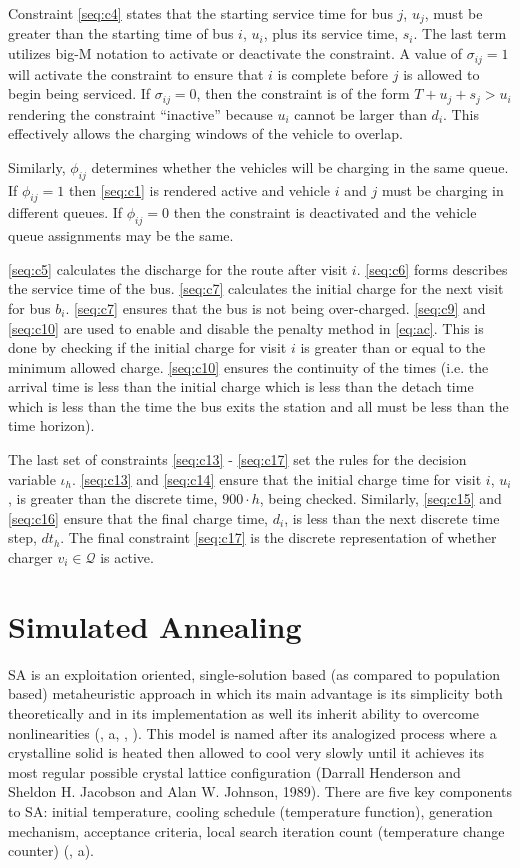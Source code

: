 \documentclass[11pt,a4paper,final]{article}
\newcommand{\Qset}{\mathcal{Q}}             %
\begin{document}
Constraint \ref{seq:c4} states that the starting service time for bus \(j\), \(u_j\), must be greater than the starting time
of bus \(i\), \(u_i\), plus its service time, \(s_i\). The last term utilizes big-M notation to activate or deactivate the
constraint. A value of \(\sigma_{ij} = 1\) will activate the constraint to ensure that \(i\) is complete before \(j\) is
allowed to begin being serviced. If \(\sigma_{ij} = 0\), then the constraint is of the form \(T + u_j + s_j > u_i\)
rendering the constraint ``inactive'' because \(u_i\) cannot be larger than \(d_i\). This effectively allows the charging
windows of the vehicle to overlap.

Similarly, \(\phi_{ij}\) determines whether the vehicles will be charging in the same queue. If \(\phi_{ij} = 1\) then
\eqref{seq:c1} is rendered active and vehicle \(i\) and \(j\) must be charging in different queues. If \(\phi_{ij} = 0\) then
the constraint is deactivated and the vehicle queue assignments may be the same.

\ref{seq:c5} calculates the discharge for the route after visit \(i\). \ref{seq:c6} forms describes the service time of
the bus. \ref{seq:c7} calculates the initial charge for the next visit for bus \(b_i\). \ref{seq:c7} ensures that the bus
is not being over-charged. \ref{seq:c9} and \ref{seq:c10} are used to enable and disable the penalty method in \ref{eq:ac}.
This is done by checking if the initial charge for visit \(i\) is greater than or equal to the minimum allowed charge.
\ref{seq:c10} ensures the continuity of the times (i.e. the arrival time is less than the initial charge which is less
than the detach time which is less than the time the bus exits the station and all must be less than the time horizon).

The last set of constraints \ref{seq:c13} - \ref{seq:c17} set the rules for the decision variable \(\iota_h\).
\ref{seq:c13} and \ref{seq:c14} ensure that the initial charge time for visit \(i\), \(u_i\), is greater than the discrete
time, \(900 \cdot h\), being checked. Similarly, \ref{seq:c15} and \ref{seq:c16} ensure that the final charge time, \(d_i\),
is less than the next discrete time step, \(dt_h\). The final constraint \ref{seq:c17} is the discrete representation of
whether charger \(v_i \in \Qset\) is active.
\section{Simulated Annealing}
\label{sec:simulated-annealing}
SA is an exploitation oriented, single-solution based (as compared to population based) metaheuristic approach in which
its main advantage is its simplicity both theoretically and in its implementation as well its inherit ability to
overcome nonlinearities (, a, , ). This model is named after its
analogized process where a crystalline solid is heated then allowed to cool very slowly until it achieves its most
regular possible crystal lattice configuration (Darrall Henderson and Sheldon H. Jacobson and Alan W. Johnson, 1989). There are five key components to SA:
initial temperature, cooling schedule (temperature function), generation mechanism, acceptance criteria, local search
iteration count (temperature change counter) (, a).
\end{document}
